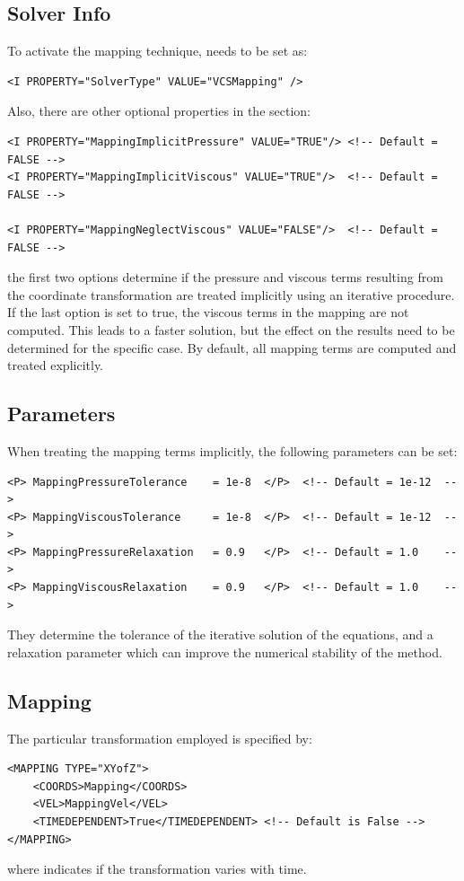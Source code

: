 \subsection{Solver Info}

To activate the mapping technique,  needs to be set as:
\begin{lstlisting}[style=XMLStyle]
<I PROPERTY="SolverType" VALUE="VCSMapping" />
\end{lstlisting}
Also, there are other optional properties in the  section:
\begin{lstlisting}[style=XMLStyle]
<I PROPERTY="MappingImplicitPressure" VALUE="TRUE"/> <!-- Default = FALSE -->
<I PROPERTY="MappingImplicitViscous" VALUE="TRUE"/>  <!-- Default = FALSE -->

<I PROPERTY="MappingNeglectViscous" VALUE="FALSE"/>  <!-- Default = FALSE -->
\end{lstlisting}
the first two options determine if the pressure and viscous terms resulting from the
coordinate transformation are treated implicitly using an iterative procedure. If the last
option is set to true, the viscous terms in the mapping are not computed. This leads to a
faster solution, but the effect on the results need to be determined for the specific case. 
 By default, all mapping terms are computed and treated explicitly.
 
\subsection{Parameters}

When treating the mapping terms implicitly, the following parameters can be set:
\begin{lstlisting}[style=XMLStyle]
<P> MappingPressureTolerance    = 1e-8  </P>  <!-- Default = 1e-12  -->
<P> MappingViscousTolerance     = 1e-8  </P>  <!-- Default = 1e-12  -->
<P> MappingPressureRelaxation   = 0.9   </P>  <!-- Default = 1.0    -->
<P> MappingViscousRelaxation    = 0.9   </P>  <!-- Default = 1.0    -->
\end{lstlisting}
They determine the tolerance of the iterative solution of the equations, 
and a relaxation parameter which can improve the numerical stability of the method.

\subsection{Mapping}

The particular transformation employed is specified by:
\begin{lstlisting}[style=XMLStyle]
<MAPPING TYPE="XYofZ">
    <COORDS>Mapping</COORDS>
    <VEL>MappingVel</VEL>
    <TIMEDEPENDENT>True</TIMEDEPENDENT> <!-- Default is False -->
</MAPPING>
\end{lstlisting}
where  indicates if the transformation varies 
with time.

